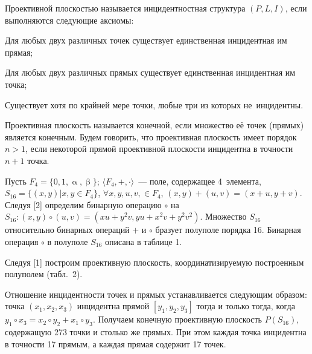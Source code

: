  

\makeProcTitle
{}


Проективной плоскостью называется инцидентностная структура $(P, L, I)$, если выполняются следующие аксиомы:
\begin{description}[noitemsep]\vspace{-6pt}
\item[А1.] Для любых двух различных точек существует единственная инцидентная им прямая;
\item[А2.] Для любых двух различных прямых существует единственная инцидентная им точка;
\item[А3.] Существует хотя по крайней мере точки, любые три из которых не~инцидентны.
\end{description}\vspace{-8pt}

Проективная плоскость называется конечной, если множество её точек (прямых) является конечным. Будем говорить, что проективная плоскость имеет порядок $n>1$, если некоторой прямой проективной плоскости инцидентна в точности $n+1$ точка.

Пусть $F_4 = \lbrace0,1,\upalpha,\upbeta\rbrace$; $\langle F_4,+,\cdot \rangle$~--- поле, содержащее 4~элемента,\\ $S_{16} = \lbrace (x,y)|x,y \in F_4 \rbrace$, $\forall x,y,u,v, \in F_4$, $(x,y)+(u,v)=(x+u,y+v)$. Следуя [2] определим бинарную операцию $\circ$ на $S_{16} : (x,y)\circ(u,v) = (xu+y^2v, yu+x^2v+y^2v^2)$. Множество $S_{16}$
относительно бинарных операций $+$ и $\circ$ бразует полуполе порядка 16. Бинарная операция $\circ$ в полуполе $S_{16}$ описана в таблице 1.



\clearpage
Следуя [1] построим проективную плоскость, координатизируемую построенным полуполем (табл.~2).



Отношение инцидентности точек и прямых устанавливается следующим образом: точка $(x_1,x_2,x_3)$ инцидентна прямой $[y_1,y_2,y_3]$ тогда и только тогда, когда $y_1 \circ x_3 = x_2 \circ y_2 + x_1 \circ y_3$. Получаем конечную проективную плоскость $P(S_{16})$, содержащую 273 точки и столько же прямых. При этом каждая точка инцидентна в точности 17 прямым, а каждая прямая содержит 17 точек.



